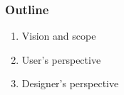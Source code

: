 \begin{frame}
\frametitle{Outline}
\begin{enumerate}
\item Vision and scope
\item User's perspective
\item Designer's perspective
\end{enumerate}
\end{frame}
